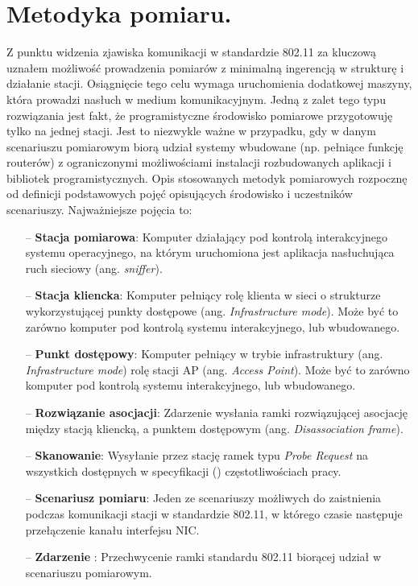 \section{Metodyka pomiaru.}
Z punktu widzenia zjawiska komunikacji w standardzie 802.11 za kluczową uznałem możliwość prowadzenia pomiarów z minimalną ingerencją w strukturę i działanie stacji. Osiągnięcie tego celu wymaga uruchomienia dodatkowej maszyny, która prowadzi nasłuch w medium komunikacyjnym. Jedną z zalet tego typu rozwiązania jest fakt, że programistyczne środowisko pomiarowe przygotowuję tylko na jednej stacji. Jest to niezwykle ważne w przypadku, gdy w danym scenariuszu pomiarowym biorą udział systemy wbudowane (np. pełniące funkcję routerów) z ograniczonymi możliwościami instalacji rozbudowanych aplikacji i bibliotek programistycznych. 
Opis stosowanych metodyk pomiarowych rozpocznę od definicji podstawowych pojęć opisujących środowisko i uczestników scenariuszy. Najważniejsze pojęcia to:
\begin{itemize}
\item[--] {\bf Stacja pomiarowa}: Komputer działający pod kontrolą interakcyjnego systemu operacyjnego, na którym uruchomiona jest aplikacja nasłuchująca ruch sieciowy (ang. \emph{sniffer}).
\item[--] {\bf Stacja kliencka}: Komputer pełniący rolę klienta w sieci o strukturze wykorzystującej punkty dostępowe (ang. \emph{Infrastructure mode}). Może być to zarówno komputer pod kontrolą systemu interakcyjnego, lub wbudowanego.
\item[--] {\bf Punkt dostępowy}: Komputer pełniący w trybie infrastruktury (ang. \emph{Infrastructure mode}) rolę stacji AP (ang. \emph{Access Point}). Może być to zarówno komputer pod kontrolą systemu interakcyjnego, lub wbudowanego.
\item[--] {\bf Rozwiązanie asocjacji}: Zdarzenie wysłania ramki rozwiązującej asocjację między stacją kliencką, a punktem dostępowym (ang. \emph{Disassociation frame}).
\item[--] {\bf Skanowanie}: Wysyłanie przez stację ramek typu \emph{Probe Request} na wszystkich dostępnych w specyfikacji (\cite{std:IEEE80211}) częstotliwościach pracy.
\item[--] {\bf Scenariusz pomiaru}: Jeden ze scenariuszy możliwych do zaistnienia podczas komunikacji stacji w standardzie 802.11, w którego czasie następuje przełączenie kanału interfejsu NIC.
\item[--] {\bf Zdarzenie }: Przechwycenie ramki standardu 802.11 biorącej udział w scenariuszu pomiarowym. 
\end{itemize}

